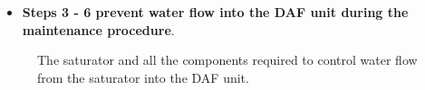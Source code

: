 \documentclass[
  letterpaper,
  DIV=11,
  numbers=noendperiod]{scrreprt}
\providecommand{\tightlist}{%
  \setlength{\itemsep}{0pt}\setlength{\parskip}{0pt}}\usepackage{longtable,booktabs,array}
\begin{document}
\begin{itemize}
\tightlist
\item
  \textbf{Steps 3 - 6 prevent water flow into the DAF unit during the
  maintenance procedure}.
\end{itemize}

\begin{figure}[H]

\begin{minipage}[t]{0.50\linewidth}

{\centering 


}

\end{minipage}%
%
\begin{minipage}[t]{0.50\linewidth}

{\centering 


}

\end{minipage}%
\newline
\begin{minipage}[t]{0.50\linewidth}

{\centering 


}

\end{minipage}%
%
\begin{minipage}[t]{0.50\linewidth}

{\centering 


}

\end{minipage}%

\caption{\label{fig-sat-comp}The saturator and all the components
required to control water flow from the saturator into the DAF unit.}

\end{figure}
\end{document}
